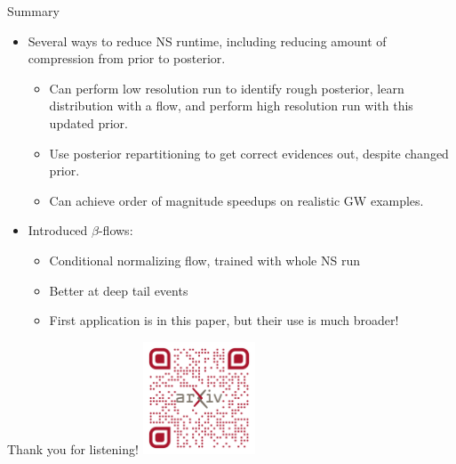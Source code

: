 \documentclass[aspectratio=169]{beamer}
\begin{document}
\begin{frame}{Summary}
    \begin{itemize}
        \item<1-> Several ways to reduce NS runtime, including reducing amount of compression from prior to posterior.
        \begin{itemize}
        \item<1-> Can perform low resolution run to identify rough posterior, learn distribution with a flow, and perform high resolution run with this updated prior.
        \item<1-> Use posterior repartitioning to get correct evidences out, despite changed prior.
        \item<1-> Can achieve order of magnitude speedups on realistic GW examples.
        \end{itemize}\vfill
        \item<2-> Introduced $\beta$-flows:
        \begin{itemize}
            \item<2-> Conditional normalizing flow, trained with whole NS run
            \item<2-> Better at deep tail events
            \item<2-> First application is in this paper, but their use is much broader!
        \end{itemize}
    \end{itemize}
\end{frame}

\begin{frame}{}
    \centering
    Thank you for listening!
    \vfill
    \includegraphics[width=0.25\textwidth]{Ca_Foscari Beamer/qr-code.png}
\end{frame}
\end{document}
